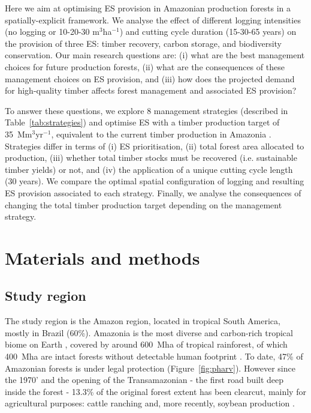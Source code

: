 \documentclass{article}
\begin{document}
Here we aim at optimising ES provision in Amazonian production forests in a spatially-explicit framework. We analyse the effect of different logging intensities (no logging or 10-20-30 m$^3$ha$^{-1}$) and cutting cycle duration (15-30-65 years) on the provision of three ES: timber recovery, carbon storage, and biodiversity conservation. Our main research questions are: (i) what are the best management choices for future production forests, (ii) what are the consequences of these management choices on ES provision, and (iii) how does the projected demand for high-quality timber affects forest management and associated ES provision? 

To answer these questions, we explore 8 management strategies (described in Table~\ref{tab:strategies}) and optimise ES with a timber production target of 35~Mm$^3$yr$^{-1}$, equivalent to the current timber production in Amazonia \cite{Lentini2005}. Strategies differ in terms of (i) ES prioritisation, (ii) total forest area allocated to production, (iii) whether total timber stocks must be recovered (i.e. sustainable timber yields) or not, and (iv) the application of a unique cutting cycle length (30 years). We compare the optimal spatial configuration of logging and resulting ES provision associated to each strategy. 
Finally, we analyse the consequences of changing the total timber production target depending on the management strategy.

\section{Materials and methods}

\subsection{Study region}

The study region is the Amazon region, located in tropical South America, mostly in Brazil (60\%). Amazonia is the most diverse and carbon-rich tropical biome on Earth \cite{Avitabile2016,Pimm2014}, covered by around 600~Mha of tropical rainforest, of which 400~Mha are intact forests without detectable human footprint \cite{Potapov2017}. To date, 47\% of Amazonian forests is under legal protection \cite{WDPA2016} (Figure~\ref{fig:pharv}). However since the 1970' and the opening of the Transamazonian - the first road built deep inside the forest - 13.3\% of the original forest extent has been clearcut, mainly for agricultural purposes: cattle ranching and, more recently, soybean production \cite{Fearnside2017}. 
\end{document}
